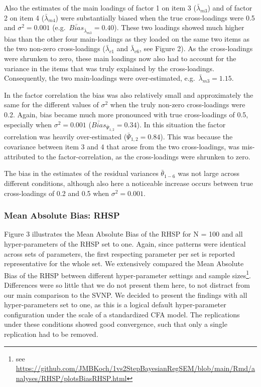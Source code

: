 \documentclass[
  man, donotrepeattitle,floatsintext]{apa6}
\begin{document}
Also the estimates of the main loadings of factor 1 on item 3 (\(\bar{\lambda}_{m 3}\)) and of factor 2 on item 4 (\(\bar{\lambda}_{m 4}\)) were substantially biased when the true cross-loadings were 0.5 and \(\sigma^2 = 0.001\) (e.g.~\(\bar{Bias}_{\bar{\lambda}_{m 3}} = 0.40\)). These two loadings showed much higher bias than the other four main-loadings as they loaded on the same two items as the two non-zero cross-loadings (\(\bar{\lambda}_{c 1}\) and \(\bar{\lambda}_{c 6}\), see Figure 2). As the cross-loadings were shrunken to zero, these main loadings now also had to account for the variance in the items that was truly explained by the cross-loadings. Consequently, the two main-loadings were over-estimated, e.g.~\(\bar{\lambda}_{m 3} = 1.15\).

In the factor correlation the bias was also relatively small and approximately the same for the different values of \(\sigma^2\) when the truly non-zero cross-loadings were 0.2. Again, bias became much more pronounced with true cross-loadings of 0.5, especially when \(\sigma^2 = 0.001\) (\(\bar{Bias}_{\bar{\Psi}_{1,2}} = 0.34\)). In this situation the factor correlation was heavily over-estimated (\(\bar{\Psi}_{1,2} = 0.84\)). This was because the covariance between item 3 and 4 that arose from the two cross-loadings, was mis-attributed to the factor-correlation, as the cross-loadings were shrunken to zero.

The bias in the estimates of the residual variances \(\bar{\theta}_{1-6}\) was not large across different conditions, although also here a noticeable increase occurs between true cross-loadings of 0.2 and 0.5 when \(\sigma^2 = 0.001\).

\hypertarget{mean-absolute-bias-rhsp}{%
\subsubsection{Mean Absolute Bias: RHSP}\label{mean-absolute-bias-rhsp}}

Figure 3 illustrates the Mean Absolute Bias of the RHSP for N = 100 and all hyper-parameters of the RHSP set to one. Again, since patterns were identical across sets of parameters, the first respecting parameter per set is reported representative for the whole set. We extensively compared the Mean Absolute Bias of the RHSP between different hyper-parameter settings and sample sizes\footnote{see \url{https://github.com/JMBKoch/1vs2StepBayesianRegSEM/blob/main/Rmd/analyses/RHSP/plotsBiasRHSP.html}}. Differences were so little that we do not present them here, to not distract from our main comparison to the SVNP. We decided to present the findings with all hyper-parameters set to one, as this is a logical default hyper-parameter configuration under the scale of a standardized CFA model. The replications under these conditions showed good convergence, such that only a single replication had to be removed.
\end{document}
